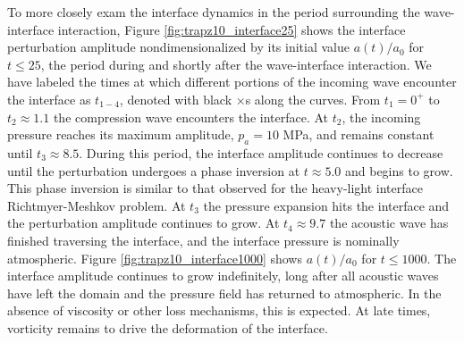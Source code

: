 \documentclass{jfm}%
\newcommand{\bs}[1]{\boldsymbol{#1}}
\begin{document}
% 
To more closely exam the interface dynamics in the period surrounding
the wave-interface interaction, Figure \ref{fig:trapz10_interface25}
shows the interface perturbation amplitude nondimensionalized by its
initial value $a(t)/a_0$ for $t\leq25$, the period during and shortly
after the wave-interface interaction. We have labeled the times at
which different portions of the incoming wave encounter the interface
as $t_{1-4}$, denoted with black $\bs{\boldsymbol{\times}}$s along the
curves. From $t_1=0^+$ to $t_2\approx1.1$ the compression wave
encounters the interface. At $t_2$, the incoming pressure reaches its
maximum amplitude, $p_a=10$ MPa, and remains constant until
$t_3\approx8.5$. During this period, the interface amplitude continues
to decrease until the perturbation undergoes a
phase inversion at $t\approx 5.0$ and begins to grow. This phase inversion is similar to
that observed for the heavy-light interface Richtmyer-Meshkov
problem. At $t_3$ the pressure expansion hits the interface and the
perturbation amplitude continues to grow. At $t_4\approx9.7$ the
acoustic wave has finished traversing the interface, and the interface
pressure is nominally atmospheric. Figure
\ref{fig:trapz10_interface1000} shows $a(t)/a_0$ for $t\leq1000$. The
interface amplitude continues to grow indefinitely, long after all
acoustic waves have left the domain and the pressure field has
returned to atmospheric. In the absence of viscosity or other loss
mechanisms, this is expected. At late times, vorticity remains to
drive the deformation of the interface.
% 
% 
\end{document}
